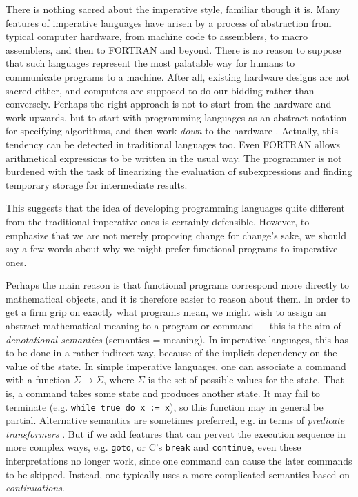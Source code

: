 There is nothing sacred about the imperative style, familiar though it is. Many
features of imperative languages have arisen by a process of abstraction from
typical computer hardware, from machine code to assemblers, to macro
assemblers, and then to FORTRAN and beyond. There is no reason to suppose that
such languages represent the most palatable way for humans to communicate
programs to a machine. After all, existing hardware designs are not sacred
either, and computers are supposed to do our bidding rather than conversely.
Perhaps the right approach is not to start from the hardware and work upwards,
but to start with programming languages as an abstract notation for specifying
algorithms, and then work {\em down} to the hardware
\cite{dijkstra-discipline}. Actually, this tendency can be detected in
traditional languages too. Even FORTRAN allows arithmetical expressions to be
written in the usual way. The programmer is not burdened with the task of
linearizing the evaluation of subexpressions and finding temporary storage for
intermediate results.

This suggests that the idea of developing programming languages quite different
from the traditional imperative ones is certainly defensible. However, to
emphasize that we are not merely proposing change for change's sake, we should
say a few words about why we might prefer functional programs to imperative
ones.

Perhaps the main reason is that functional programs correspond more directly to
mathematical objects, and it is therefore easier to reason about them. In order
to get a firm grip on exactly what programs mean, we might wish to assign an
abstract mathematical meaning to a program or command --- this is the aim of
{\em denotational semantics} (semantics = meaning). In imperative languages,
this has to be done in a rather indirect way, because of the implicit
dependency on the value of the state. In simple imperative languages, one can
associate a command with a function $\Sigma \to \Sigma$, where $\Sigma$ is the
set of possible values for the state. That is, a command takes some state and
produces another state. It may fail to terminate (e.g. {\tt while true do x :=
x}), so this function may in general be partial. Alternative semantics are
sometimes preferred, e.g. in terms of {\em predicate transformers}
\cite{dijkstra-discipline}. But if we add features that can pervert the
execution sequence in more complex ways, e.g. {\tt goto}, or C's {\tt break}
and {\tt continue}, even these interpretations no longer work, since one
command can cause the later commands to be skipped. Instead, one typically uses
a more complicated semantics based on {\em continuations}.

